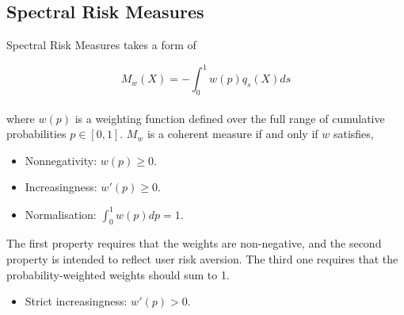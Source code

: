 \documentclass[11pt,a4paper,english]{article}
\begin{document}

\subsection{Spectral Risk Measures}\label{subsec:spectral-risk-measures}
Spectral Risk Measures takes a form of

\begin{equation}\label{eq:SRM}
	M_{w}(X)=- \int^1_{0} w(p)q_{s}(X)ds
	\end{equation}\\

\noindent where $w(p)$ is a weighting function defined over the full range of cumulative probabilities $p \in [0,1]$. $M_{w}$ is a coherent measure if and only if $w$ satisfies, \\

\begin{itemize}
			\item Nonnegativity: $w(p) \ge 0$.
			\item Increasingness: $w'(p) \ge 0$.
			\item Normalisation: $\int^1_{0}w(p)dp=1$.
\end{itemize}
The first property requires that the weights are non-negative, and the second property is intended to reflect user risk aversion. The third one requires that the probability-weighted weights should sum to 1. %
\begin{itemize}
			\item Strict increasingness: $w'(p) > 0$.
\end{itemize}
\end{document}
